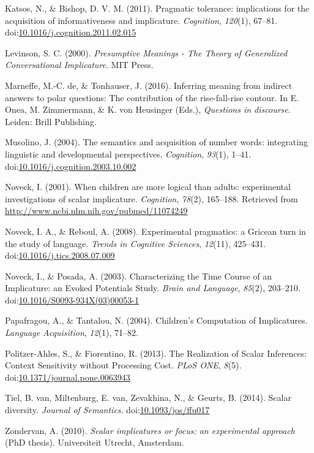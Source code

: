 \documentclass[floatsintext,man]{apa6}
\theoremstyle{definition}
\theoremstyle{definition}
\theoremstyle{definition}
\theoremstyle{remark}
\begin{document}
\hypertarget{ref-Katsos2011}{}
Katsos, N., \& Bishop, D. V. M. (2011). Pragmatic tolerance:
implications for the acquisition of informativeness and implicature.
\emph{Cognition}, \emph{120}(1), 67--81.
doi:\href{https://doi.org/10.1016/j.cognition.2011.02.015}{10.1016/j.cognition.2011.02.015}

\hypertarget{ref-levinson2000}{}
Levinson, S. C. (2000). \emph{Presumptive Meanings - The Theory of
Generalized Conversational Implicature}. MIT Press.

\hypertarget{ref-DeMarneffe2017}{}
Marneffe, M.-C. de, \& Tonhauser, J. (2016). Inferring meaning from
indirect answers to polar questions: The contribution of the
rise-fall-rise contour. In E. Onea, M. Zimmermann, \& K. von Heusinger
(Eds.), \emph{Questions in discourse}. Leiden: Brill Publishing.

\hypertarget{ref-Musolino2004}{}
Musolino, J. (2004). The semantics and acquisition of number words:
integrating linguistic and developmental perspectives. \emph{Cognition},
\emph{93}(1), 1--41.
doi:\href{https://doi.org/10.1016/j.cognition.2003.10.002}{10.1016/j.cognition.2003.10.002}

\hypertarget{ref-Noveck2001}{}
Noveck, I. (2001). When children are more logical than adults:
experimental investigations of scalar implicature. \emph{Cognition},
\emph{78}(2), 165--188. Retrieved from
\url{http://www.ncbi.nlm.nih.gov/pubmed/11074249}

\hypertarget{ref-noveck2008}{}
Noveck, I. A., \& Reboul, A. (2008). Experimental pragmatics: a Gricean
turn in the study of language. \emph{Trends in Cognitive Sciences},
\emph{12}(11), 425--431.
doi:\href{https://doi.org/10.1016/j.tics.2008.07.009}{10.1016/j.tics.2008.07.009}

\hypertarget{ref-Noveck2003}{}
Noveck, I., \& Posada, A. (2003). Characterizing the Time Course of an
Implicature: an Evoked Potentials Study. \emph{Brain and Language},
\emph{85}(2), 203--210.
doi:\href{https://doi.org/10.1016/S0093-934X(03)00053-1}{10.1016/S0093-934X(03)00053-1}

\hypertarget{ref-Papafragou2004}{}
Papafragou, A., \& Tantalou, N. (2004). Children's Computation of
Implicatures. \emph{Language Acquisition}, \emph{12}(1), 71--82.

\hypertarget{ref-Politzer-Ahles2013}{}
Politzer-Ahles, S., \& Fiorentino, R. (2013). The Realization of Scalar
Inferences: Context Sensitivity without Processing Cost. \emph{PLoS
ONE}, \emph{8}(5).
doi:\href{https://doi.org/10.1371/journal.pone.0063943}{10.1371/journal.pone.0063943}

\hypertarget{ref-VanTiel2014}{}
Tiel, B. van, Miltenburg, E. van, Zevakhina, N., \& Geurts, B. (2014).
Scalar diversity. \emph{Journal of Semantics}.
doi:\href{https://doi.org/10.1093/jos/ffu017}{10.1093/jos/ffu017}

\hypertarget{ref-Zondervan2010}{}
Zondervan, A. (2010). \emph{Scalar implicatures or focus: an
experimental approach} (PhD thesis). Universiteit Utrecht, Amsterdam.
\end{document}
